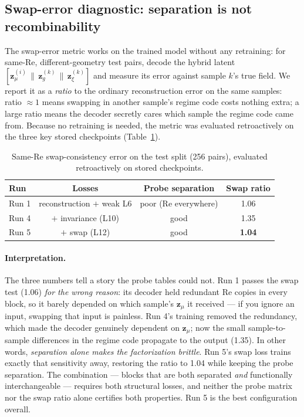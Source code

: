 \documentclass[11pt]{article}
\begin{document}
\subsection{Swap-error diagnostic: separation is not recombinability}
\label{sec:swap}

The swap-error metric works on the trained model without any retraining:
for same-Re, different-geometry test pairs, decode the hybrid latent
$[\boldsymbol{z}_{\mu}^{(i)} \,\|\, \boldsymbol{z}_{g}^{(k)} \,\|\,
\boldsymbol{z}_{\xi}^{(k)}]$ and measure its error against sample $k$'s
true field. We report it as a \emph{ratio} to the ordinary reconstruction
error on the same samples: ratio $\approx 1$ means swapping in another
sample's regime code costs nothing extra; a large ratio means the decoder
secretly cares which sample the regime code came from. Because no
retraining is needed, the metric was evaluated retroactively on the three
key stored checkpoints (Table~\ref{tab:swap}).

\begin{table}[htbp]
  \centering
  \caption{Same-Re swap-consistency error on the test split (256 pairs),
  evaluated retroactively on stored checkpoints.}
  \label{tab:swap}
  \begin{tabular}{lccc}
    \toprule
    Run & Losses & Probe separation & Swap ratio \\
    \midrule
    Run 1 & reconstruction $+$ weak L6 & poor (Re everywhere) & 1.06 \\
    Run 4 & $+$ invariance (L10)       & good                 & 1.35 \\
    Run 5 & $+$ swap (L12)             & good                 & \textbf{1.04} \\
    \bottomrule
  \end{tabular}
\end{table}

\paragraph{Interpretation.} The three numbers tell a story the probe
tables could not. Run 1 passes the swap test (1.06) \emph{for the wrong
reason}: its decoder held redundant Re copies in every block, so it
barely depended on which sample's $\boldsymbol{z}_{\mu}$ it received ---
if you ignore an input, swapping that input is painless. Run 4's training
removed the redundancy, which made the decoder genuinely dependent on
$\boldsymbol{z}_{\mu}$; now the small sample-to-sample differences in the
regime code propagate to the output (1.35). In other words,
\emph{separation alone makes the factorization brittle}. Run 5's swap
loss trains exactly that sensitivity away, restoring the ratio to 1.04
while keeping the probe separation. The combination --- blocks that are
both separated \emph{and} functionally interchangeable --- requires both
structural losses, and neither the probe matrix nor the swap ratio alone
certifies both properties. Run 5 is the best configuration overall.
\end{document}
